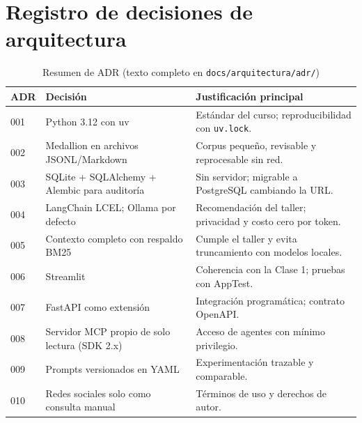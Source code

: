 \section{Registro de decisiones de arquitectura}
\begin{table}[H]\centering\small
\caption{Resumen de ADR (texto completo en \texttt{docs/arquitectura/adr/})}\label{tab:adr}
\begin{tabularx}{\linewidth}{@{}l X X@{}}\toprule
ADR & Decisión & Justificación principal\\\midrule
001 & Python 3.12 con uv & Estándar del curso; reproducibilidad con \texttt{uv.lock}.\\
002 & Medallion en archivos JSONL/Markdown & Corpus pequeño, revisable y reprocesable sin red.\\
003 & SQLite + SQLAlchemy + Alembic para auditoría & Sin servidor; migrable a PostgreSQL cambiando la URL.\\
004 & LangChain LCEL; Ollama por defecto & Recomendación del taller; privacidad y costo cero por token.\\
005 & Contexto completo con respaldo BM25 & Cumple el taller y evita truncamiento con modelos locales.\\
006 & Streamlit & Coherencia con la Clase 1; pruebas con AppTest.\\
007 & FastAPI como extensión & Integración programática; contrato OpenAPI.\\
008 & Servidor MCP propio de solo lectura (SDK 2.x) & Acceso de agentes con mínimo privilegio.\\
009 & Prompts versionados en YAML & Experimentación trazable y comparable.\\
010 & Redes sociales solo como consulta manual & Términos de uso y derechos de autor.\\\bottomrule
\end{tabularx}
\end{table}

